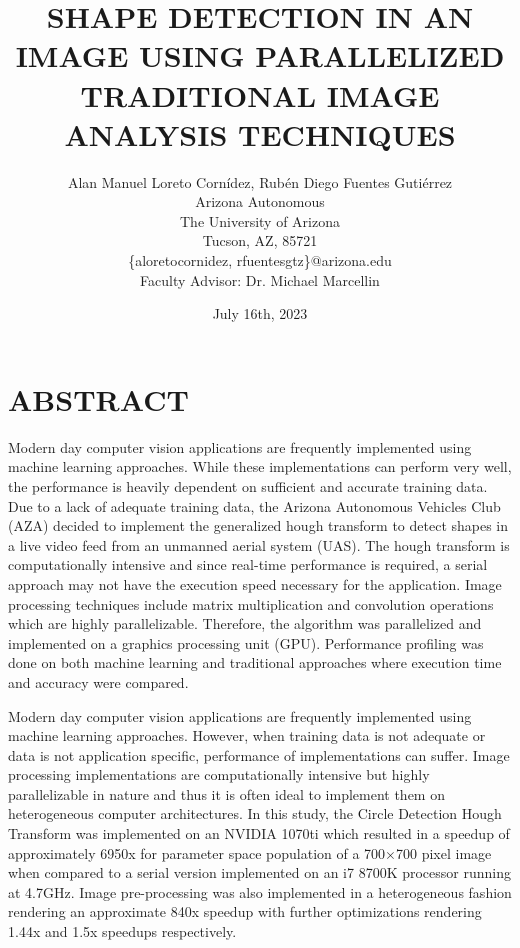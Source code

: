 \documentclass[12pt]{article}
\title{\Large \vspace{-0.5in}
\MakeUppercase{Shape Detection in an Image using Parallelized Traditional Image Analysis Techniques}}
\author{Alan Manuel Loreto Cornídez, Rubén Diego Fuentes Gutiérrez\\
    \normalsize Arizona Autonomous\\
    \normalsize The University of Arizona\\
    \normalsize Tucson, AZ, 85721\\
    \normalsize \{aloretocornidez, rfuentesgtz\}@arizona.edu\\[6pt]
    Faculty Advisor: Dr. Michael Marcellin\\
    }
\date{July 16th, 2023}
\begin{document}
\maketitle %





\section{\MakeUppercase{Abstract}}
\noindent
Modern day computer vision applications are frequently implemented using machine learning approaches.
While these implementations can perform very well, the performance is heavily dependent on sufficient and accurate training data.
Due to a lack of adequate training data, the Arizona Autonomous Vehicles Club (AZA) decided to implement the generalized hough transform to detect shapes in a live video feed from an unmanned aerial system (UAS).
The hough transform is computationally intensive and since real-time performance is required, a serial approach may not have the execution speed necessary for the application.
Image processing techniques include matrix multiplication and convolution operations which are highly parallelizable.
Therefore, the algorithm was parallelized and implemented on a graphics processing unit (GPU).
Performance profiling was done on both machine learning and traditional approaches where execution time and accuracy were compared.

Modern day computer vision applications are frequently implemented using machine learning approaches.
However, when training data is not adequate or data is not application specific, performance of implementations can suffer.
Image processing implementations are computationally intensive but highly parallelizable in nature and thus it is often ideal to implement them on heterogeneous computer architectures.
In this study, the Circle Detection Hough Transform was implemented on an NVIDIA 1070ti which resulted in a speedup of approximately 6950x for parameter space population of a 700$\times$700 pixel image when compared to a serial version implemented on an i7 8700K processor running at 4.7GHz.
Image pre-processing was also implemented in a heterogeneous fashion rendering an approximate 840x speedup with further optimizations rendering 1.44x and 1.5x speedups respectively. 
\end{document}

